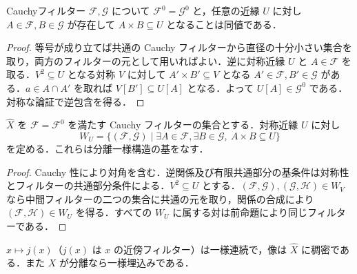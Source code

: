 \begin{prop}[Cauchyフィルターの同値性]
Cauchyフィルター $\mathcal F,\mathcal G$ について $\mathcal F^0=\mathcal G^0$ と，任意の近縁 $U$ に対し $A\in\mathcal F,B\in\mathcal G$ が存在して $A\times B\subseteq U$ となることは同値である．
\end{prop}
\begin{proof}
等号が成り立てば共通の Cauchy フィルターから直径の十分小さい集合を取り，両方のフィルターの元として用いればよい．逆に対称近縁 $U$ と $A\in\mathcal F$ を取る．$V^2\subseteq U$ となる対称 $V$ に対して $A'\times B'\subseteq V$ となる $A'\in\mathcal F,B'\in\mathcal G$ がある．$a\in A\cap A'$ を取れば $V[B']\subseteq U[A]$ となる．よって $U[A]\in\mathcal G^0$ である．対称な論証で逆包含を得る．
\end{proof}
\begin{prop}[完備化の一様構造]
$\widehat X$ を $\mathcal F=\mathcal F^0$ を満たす Cauchy フィルターの集合とする．対称近縁 $U$ に対し
\[
W_U=\{(\mathcal F,\mathcal G)\mid\exists A\in\mathcal F,\exists B\in\mathcal G,\ A\times B\subseteq U\}
\]
を定める．これらは分離一様構造の基をなす．
\end{prop}
\begin{proof}
Cauchy 性により対角を含む．逆関係及び有限共通部分の基条件は対称性とフィルターの共通部分条件による．$V^2\subseteq U$ とする．$(\mathcal F,\mathcal G),(\mathcal G,\mathcal H)\in W_V$ なら中間フィルターの二つの集合に共通の元を取り，関係の合成により $(\mathcal F,\mathcal H)\in W_U$ を得る．すべての $W_U$ に属する対は前命題により同じフィルターである．
\end{proof}
\begin{prop}[完備化への標準写像]
$x\mapsto j(x)$（$j(x)$ は $x$ の近傍フィルター）は一様連続で，像は $\widehat X$ に稠密である．また $X$ が分離なら一様埋込みである．
\end{prop}

